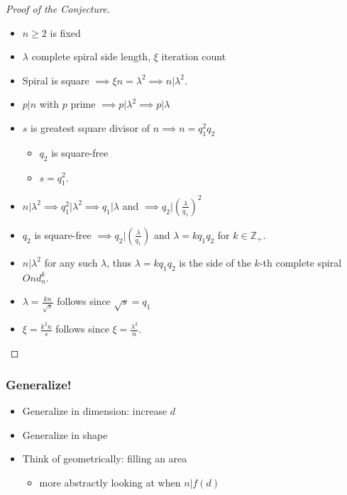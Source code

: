 \documentclass{beamer}
\theoremstyle{mydef}
\begin{document}
\frame
{

\begin{proof}[Proof of the Conjecture]
\begin{itemize}
  \item $n\ge 2$ is fixed
  \item $\lambda$  complete spiral side length, $\xi$ iteration count
  \item Spiral is square $\implies \xi n = \lambda^2 \implies n \vert \lambda^2$.
  \item $p \vert n$ with $p$ prime $\implies p \vert \lambda^2 \implies p \vert \lambda$
  \item $s$ is greatest square divisor of $n \implies n = q^2_1 q_2$
  \begin{itemize}
  \item $q_2$ is square-free
  \item $s = q_1^2$.
  \end{itemize}
   
  \item  $n \vert \lambda^2 \implies q_1^2\vert\lambda^2 \implies q_1|\lambda$ and $\implies q_2 \vert (\frac{\lambda}{q_1})^2$
  
  \item $q_2$ is square-free $\implies q_2\vert (\frac{\lambda}{q_1})$ and $\lambda = k q_1 q_2$ for $k\in \mathbb{Z}_{+}$.  
  \item $n\vert\lambda^2$ for any such $\lambda$, thus $\lambda = k q_1 q_2$ is the side of the $k$-th complete spiral $Ond^k_n$.

  \item $\lambda = \frac{kn}{\sqrt{s}}$ follows since $\sqrt{s} = q_1$
  \item $\xi = \frac{k^2n}{s}$ follows since $\xi = \frac{\lambda^2}{n}$.  
  \end{itemize}
\end{proof}
}

\frame
{
\frametitle{Generalize!}

  \begin{itemize}
  \item Generalize in dimension: increase $d$
  \item Generalize in shape
  \item Think of geometrically: filling an area
  \begin{itemize}
  \item more abstractly looking at when $n \vert f(d)$
  \end{itemize}
  \end{itemize}
}
\end{document}
